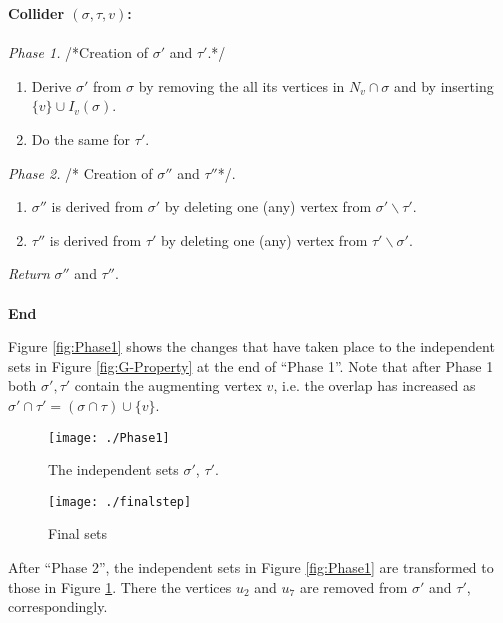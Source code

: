 \documentclass[a4paper,10pt]{article}
\begin{document}
\noindent
{\bf Collider $(\sigma, \tau, v)$:} 
\\ \vspace{-.3cm}\\
{\em  Phase 1.} \hspace*{0.5cm} /*Creation of $\sigma'$ and $\tau'$.*/ \vspace{-.1cm} 
\begin{enumerate}
\item Derive $\sigma'$ from $\sigma$ by removing the all its vertices in $N_{v}\cap \sigma$
and by inserting $\{v\} \cup I_{v}(\sigma)$.
	\item Do the same for $\tau'$. 
\end{enumerate}
{\em  Phase 2.} \hspace*{0.5cm} /* Creation of $\sigma''$ and $\tau''$*/. \vspace{-.1cm}
\begin{enumerate}
	\item $\sigma''$ is derived from $\sigma'$ by deleting one  (any) vertex
	from $\sigma'\backslash \tau'$.
	\item $\tau''$ is derived from $\tau'$ by deleting one  (any) vertex 
	from $\tau'\backslash \sigma'$.
\end{enumerate}
 {\em Return}  $\sigma''$ and $\tau''$.\\ \vspace{-.3cm}\\
{\bf End}\\ \vspace{-.3cm}

\noindent
Figure \ref{fig:Phase1} shows the changes that have taken place 
to the independent sets in Figure \ref{fig:G-Property} at the 
end of ``Phase 1''. Note that after Phase 1 both $\sigma', \tau'$ contain the 
augmenting vertex $v$, i.e. the overlap has increased as 
$\sigma'\cap \tau'=(\sigma\cap\tau)\cup\{v\}$.
\begin{figure}
\begin{minipage}{0.5\textwidth}
	\centering
		\texttt{[image: ./Phase1]}
	\caption{The independent sets $\sigma' $, $\tau'$. }
	\label{fig:Phase1}
\end{minipage}
\begin{minipage}{0.5\textwidth}
	\centering
		\texttt{[image: ./finalstep]}
	\caption{Final sets }
	\label{fig:finalstep}
\end{minipage}
\end{figure}
After ``Phase 2'', the independent sets in  Figure \ref{fig:Phase1}
are transformed to those in Figure \ref{fig:finalstep}. There the
vertices $u_2$ and $u_7$ are removed from $\sigma'$ and $\tau'$,
correspondingly.
\end{document}

